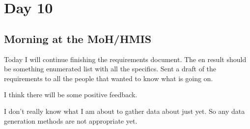 \section{Day 10}
\subsection{Morning at the MoH/HMIS}
Today I will continue finishing the requirements document.
The en result should be something enumerated list with all the specifics.
Sent a draft of the requirements to all the people that wanted to know what is going on.

I think there will be some positive feedback.

I don't really know what I am about to gather data about just yet.
So any data generation methods are not appropriate yet.